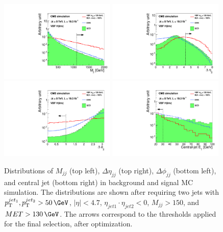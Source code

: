 \begin{figure}[!htb]
\centering
\includegraphics[width=0.49\textwidth]{Chapter05/Images/VBF-Dijet-M.pdf}
\includegraphics[width=0.49\textwidth]{Chapter05/Images/VBF-Dijet-DEta.pdf}     
\includegraphics[width=0.49\textwidth]{Chapter05/Images/VBF-Dijet-DPhi.pdf}
\includegraphics[width=0.49\textwidth]{Chapter05/Images/VBF-CJV-pT.pdf} 
\caption{Distributions of $M_{jj}$ (top left), $\Delta\eta_{jj}$ (top right), $\Delta\phi_{jj}$ (bottom left), and central jet \pt (bottom right) in background and signal MC simulation. The distributions are shown after requiring two jets with $\pt^{jet_1},\pt^{jet_2} > 50\,\GeV$, $|\eta| < 4.7$, $\eta_{jet1} \cdot \eta_{jet2} < 0$, $M_{jj}>150$\GeV, and $MET > 130\,\GeV$. The arrows correspond to the thresholds applied for the final selection, after optimization. \cite{ARTICLE:CMSVBFHiggsToInvAndZHCombination}}
\label{FIGURE:PromptDataAnalysis_EventSelection_KeyVariables}
\end{figure}

